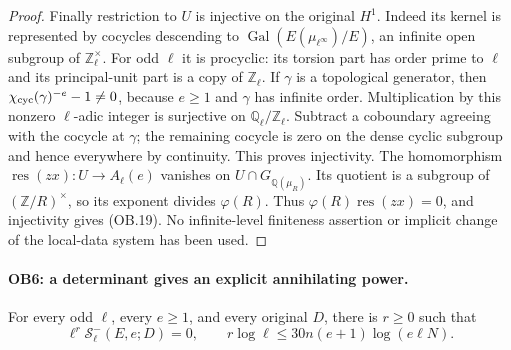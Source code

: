 \begin{proof}
Finally restriction to $U$ is injective on the original $H^1$.
Indeed its kernel is represented by cocycles descending to
$\operatorname{Gal}(E(\mu_{\ell^\infty})/E)$, an infinite open
subgroup of $\mathbb Z_\ell^\times$.  For odd $\ell$ it is
procyclic: its torsion part has order prime to $\ell$ and its
principal-unit part is a copy of $\mathbb Z_\ell$.
If $\gamma$ is a topological generator, then
$\chi_{\rm cyc}(\gamma)^{-e}-1\ne0$, because $e\ge1$ and
$\gamma$ has infinite order.  Multiplication by this nonzero
$\ell$-adic integer is surjective on
$\mathbb Q_\ell/\mathbb Z_\ell$.  Subtract a coboundary agreeing
with the cocycle at $\gamma$; the remaining cocycle is zero on
the dense cyclic subgroup and hence everywhere by continuity.
This proves injectivity.  The homomorphism
$\operatorname{res}(zx):U\to A_\ell(e)$ vanishes on
$U\cap G_{\mathbb Q(\mu_R)}$.  Its quotient is a subgroup of
$(\mathbb Z/R)^\times$, so its exponent divides $\varphi(R)$.
Thus $\varphi(R)\operatorname{res}(zx)=0$, and injectivity gives
(OB.19).  No infinite-level finiteness assertion or implicit change
of the local-data system has been used.
\end{proof}

\paragraph{OB6: a determinant gives an explicit annihilating power.}
\label{claim:OB6}
For every odd $\ell$, every $e\ge1$, and every original $D$, there
is $r\ge0$ such that
\[
 \ell^r\mathcal S_\ell^-(E,e;D)=0,\qquad
      r\log\ell\le30n(e+1)\log(e\ell N).
 \tag{OB.24}
\]

